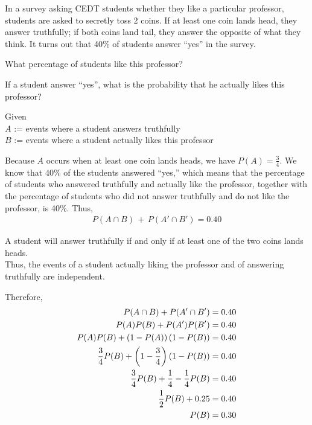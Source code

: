 \documentclass[a4paper, 10pt]{article}
\begin{document}
\begin{tosubmit}
\problem[17]
In a survey asking CEDT students whether they like a particular professor, students are asked to secretly toss 2 coins.
If at least one coin lands head, they answer truthfully;
if both coins land tail, they answer the opposite of what they think.
It turns out that 40\% of students answer ``yes'' in the survey.
\begin{subproblems}
    \item What percentage of students like this professor?
    \item If a student answer ``yes'', what is the probability that he actually likes this professor?
\end{subproblems}

\submitsolution
\par\noindent Given \\
\( A \) := events where a student answers truthfully \\
\( B \) := events where a student actually likes this professor \\

\par\noindent Because \( A \) occurs when at least one coin lands heads, we have \( P(A)=\frac{3}{4} \).
We know that 40\% of the students answered ``yes,'' which means that the percentage of students
who answered truthfully and actually like the professor,
together with the percentage of students who did not answer truthfully and do not like the professor, is 40\%. Thus,
\begin{align*}
    P(A \cap B)\,+\,P(A' \cap B')=0.40
\end{align*}

\par\noindent A student will answer truthfully if and only if at least one of the two coins lands heads. \\
Thus, the events of a student actually liking the professor and of answering truthfully are independent. \\

\par\noindent Therefore,
\begin{align*}
    P(A \cap B)+P(A' \cap B') &= 0.40 \\
    P(A)P(B)+P(A')P(B') &= 0.40 \\
    P(A)P(B)+\left(1-P(A)\right)\left(1-P(B)\right) &= 0.40 \\
    \frac{3}{4}P(B) + \left(1-\frac{3}{4}\right)\left(1-P(B)\right) &= 0.40 \\
    \frac{3}{4}P(B)+\frac{1}{4}-\frac{1}{4}P(B) &= 0.40 \\
    \frac{1}{2}P(B)+0.25 &= 0.40 \\
    P(B) &= 0.30
\end{align*}


\end{tosubmit}
\end{document}
